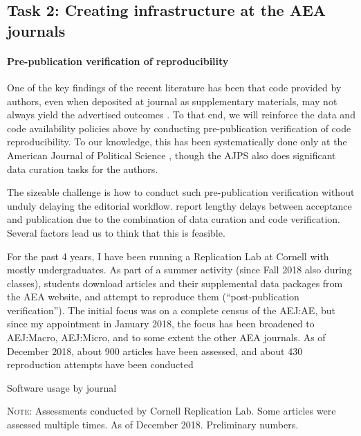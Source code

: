 \documentclass[AEJ]{AEA}
\begin{document}
\FloatBarrier
\subsection{Task 2: Creating infrastructure at the AEA journals}

\paragraph{Pre-publication verification of reproducibility} One of the key findings of the recent literature has been that code provided by authors, even when deposited at journal as supplementary materials, may not always yield the advertised outcomes \citep{Chang2015-dl,ChangAm.Econ.Rev.2017,Hoffler-LibMag.2017}. To that end, we will reinforce the data and code availability policies above by conducting pre-publication verification of code reproducibility. To our knowledge, this has been systematically done only at the American Journal of Political Science \citep{Christian2018}, though the AJPS also does significant data curation tasks for the authors.

The sizeable challenge is how to conduct such pre-publication verification without unduly delaying the editorial workflow. \cite{Christian2018} report lengthy delays between acceptance and publication due to the combination of data curation and code verification. Several factors lead us to think that this is feasible.

For the past 4 years, I have been running a Replication Lab at Cornell with mostly undergraduates. As part of a summer activity (since Fall 2018 also during classes), students download articles and their supplemental data packages from the AEA website, and attempt to reproduce them (``post-publication verification''). The initial focus was on a complete census of the AEJ:AE, but since my appointment in January 2018, the focus has been broadened to AEJ:Macro, AEJ:Micro, and to some extent the other AEA journals. As of December 2018, about 900 articles have been assessed, and about 430 reproduction attempts have been conducted 
\begin{table}
\caption{Software usage by journal\label{tab:software_by_journal}} 
\tiny
{}

\begin{minipage}{\textwidth}
	\textsc{Note:} Assessments conducted by Cornell Replication Lab. Some articles were assessed multiple times. As of December 2018. Preliminary numbers. 
\end{minipage}
\end{table}
\end{document}
